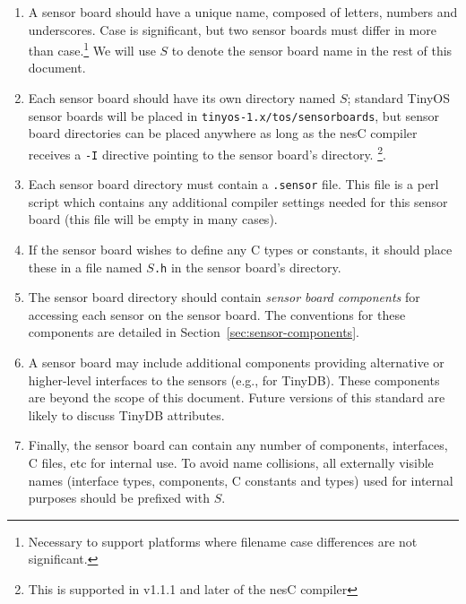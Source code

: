 \documentclass{article}
\newcommand{\fname}[1]{{\tt #1}}
\begin{document}
\begin{enumerate}

\item A sensor board should have a unique name, composed of letters, numbers and
underscores. Case is significant, but two sensor boards must differ in more
than case.\footnote{Necessary to support platforms where filename case 
differences are not significant.} We will use $S$ to denote the sensor board
name in the rest of this document.

\item Each sensor board should have its own directory named $S$; standard TinyOS
sensor boards will be placed in \fname{tinyos-1.x/tos/sensorboards}, but
sensor board directories can be placed anywhere as long as the nesC compiler
receives a {\tt -I} directive pointing to the sensor board's directory.
\footnote{This is supported in v1.1.1 and later of the nesC compiler}.

\item Each sensor board directory must contain a \fname{.sensor} file. This file
is a perl script which contains any additional compiler settings needed for
this sensor board (this file will be empty in many cases). 

\item If the sensor board wishes to define any C types or constants, it should
place these in a file named \fname{$S$.h} in the sensor board's directory.

\item The sensor board directory should contain \emph{sensor board components}
for accessing each sensor on the sensor board. The conventions for these
components are detailed in Section~\ref{sec:sensor-components}.

\item A sensor board may include additional components providing alternative or
higher-level interfaces to the sensors (e.g., for TinyDB). These components
are beyond the scope of this document. Future versions of this standard
are likely to discuss TinyDB attributes.

\item Finally, the sensor board can contain any number of components, interfaces,
C files, etc for internal use. To avoid name collisions, all externally
visible names (interface types, components, C constants and types) used for
internal purposes should be prefixed with $S$.

\end{enumerate}
\end{document}
